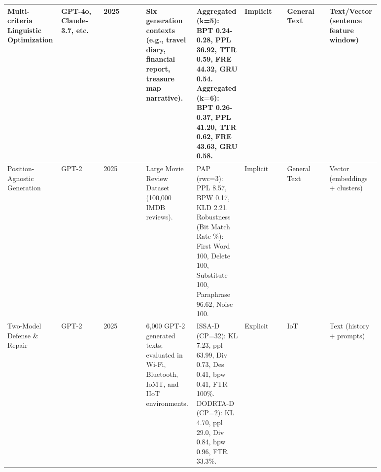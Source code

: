 \begin{longtable}{|p{0.11\linewidth}|p{0.11\linewidth}|p{0.11\linewidth}|p{0.11\linewidth}|p{0.11\linewidth}|p{0.11\linewidth}|p{0.11\linewidth}|p{0.11\linewidth}|}
Multi-criteria Linguistic Optimization \cite{wozniak2025multicriteria} & GPT-4o, Claude-3.7, etc. & 2025 & Six generation contexts (e.g., travel diary, financial report, treasure map narrative). & Aggregated (k=5): BPT 0.24-0.28, PPL 36.92, TTR 0.59, FRE 44.32, GRU 0.54. Aggregated (k=6): BPT 0.26-0.37, PPL 41.20, TTR 0.62, FRE 43.63, GRU 0.58. & Implicit & General Text & Text/Vector (sentence feature window) \\
\hline

Position-Agnostic Generation \cite{lin2025positionagnostic} & GPT-2 & 2025 & Large Movie Review Dataset (100,000 IMDB reviews). & PAP (rwc=3): PPL 8.57, BPW 0.17, KLD 2.21. Robustness (Bit Match Rate \%): First Word 100, Delete 100, Substitute 100, Paraphrase 96.62, Noise 100. & Implicit & General Text & Vector (embeddings + clusters) \\
\hline

Two-Model Defense \& Repair \cite{chen2025activetwo} & GPT-2 & 2025 & 6,000 GPT-2 generated texts; evaluated in Wi-Fi, Bluetooth, IoMT, and IIoT environments. & ISSA-D (CP=32): KL 7.23, ppl 63.99, Div 0.73, Des 0.41, bpw 0.41, FTR 100\%. DODRTA-D (CP=2): KL 4.70, ppl 29.0, Div 0.84, bpw 0.96, FTR 33.3\%. & Explicit & IoT & Text (history + prompts) \\
\hline

\end{longtable}

